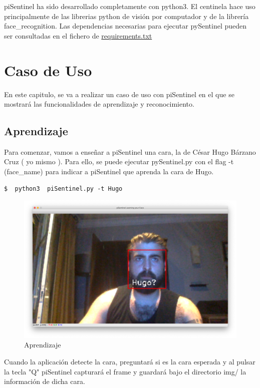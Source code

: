 \documentclass[a4paper,11pt]{book}
\begin{document}
piSentinel ha sido desarrollado completamente con python3. El centinela hace uso principalmente de las librerias python de visión por computador\cite{picv} y de la librería  face\_recognition\cite{face}. Las dependencias necesarias para ejecutar pySentinel pueden ser consultadas en el fichero de \href{https://github.com/hugobarzano/piSentinel/blob/master/requirements.txt}{ requirements.txt}


\chapter{Caso de Uso}

En este capitulo, se va a realizar un caso de uso con piSentinel en el que se mostrará las funcionalidades de aprendizaje y reconocimiento. 

\section{Aprendizaje}

Para comenzar, vamos a enseñar a piSentinel una cara, la de César Hugo Bárzano Cruz ( yo mismo ). Para ello, se puede ejecutar pySentinel.py con el flag -t (face\_name) para indicar a piSentinel que aprenda la cara de Hugo. 

\begin{lstlisting}
$  python3  piSentinel.py -t Hugo
\end{lstlisting}

\begin{figure}[H]  
\centering 
\includegraphics[scale=0.2]{imagenes/dochugo.png}
\caption{ Aprendizaje}  
\end{figure} 

Cuando la aplicación detecte la cara, preguntará si es la cara esperada y al pulsar la tecla "Q" piSentinel capturará el frame y guardará bajo el directorio img/ la información de dicha cara. 
\end{document}
